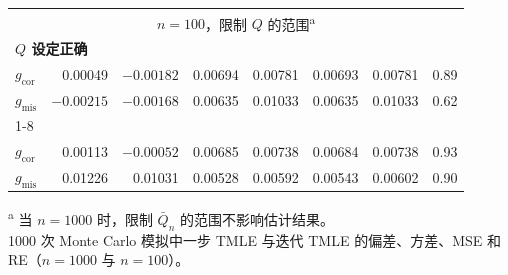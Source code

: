 \begin{table}[p]
\begin{tabular}{lrrrrrrr}
\midrule
\multicolumn{8}{c}{$n=100$，限制 $Q$ 的范围\textsuperscript{a}}\\
\multicolumn{8}{l}{\textbf{$Q$ 设定正确}}\\
$g_{\mathrm{cor}}$&0.00049&$-0.00182$&0.00694&0.00781&0.00693&0.00781&0.89\\
$g_{\mathrm{mis}}$&$-0.00215$&$-0.00168$&0.00635&0.01033&0.00635&0.01033&0.62\\
\cmidrule{1-8}
\multicolumn{8}{l}{\textbf{$Q$ 设定错误}}\\
$g_{\mathrm{cor}}$&0.00113&$-0.00052$&0.00685&0.00738&0.00684&0.00738&0.93\\
$g_{\mathrm{mis}}$&0.01226&0.01031&0.00528&0.00592&0.00543&0.00602&0.90\\
\bottomrule
\end{tabular}
\endgroup
\par\smallskip
\begin{minipage}{.97\textwidth}
\footnotesize
\textsuperscript{a} 当 $n=1000$ 时，限制 $\bar Q_n$ 的范围不影响估计结果。\\
1000 次 Monte Carlo 模拟中一步 TMLE 与迭代 TMLE 的偏差、方差、MSE 和 RE（$n=1000$ 与 $n=100$）。
\end{minipage}
\end{table}
\FloatBarrier
